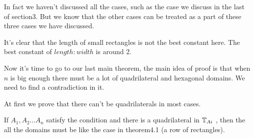 \begin{rem}
	In fact we haven't discussed all the cases, such as the case
	we discuss in the last of section3. But we know that the other cases 
	can be treated as a part of these three cases we have discussed.
\end{rem}

\begin{rem}
	It's clear that the length of small rectangles is not the best 
	constant here. The best constant of $length:width$ is around 2.
\end{rem}

Now it's time to go to our last main theorem, the main idea of proof 
is that when $n$ is big enough there must be a lot of quadrilateral 
and hexagonal domains. We need to find a contradiction in it.

At first we prove that there can't be quadrilaterals in most cases.

\begin{thm}
	If $A_1, A_2 ... A_n$ satisfy the condition and there is 
	a quadrilateral in $\mathbb{T}_{Ai}$ , then the all the domains 
	must be like the case in theorem4.1 (a row of rectangles).
\end{thm}

